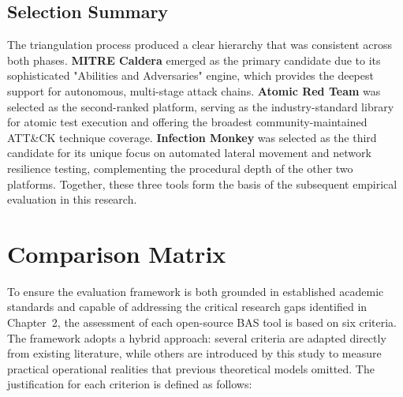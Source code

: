 \subsection{Selection Summary}
The triangulation process produced a clear hierarchy that was consistent across both phases. \textbf{MITRE Caldera} emerged as the primary candidate due to its sophisticated "Abilities and Adversaries" engine, which provides the deepest support for autonomous, multi-stage attack chains. \textbf{Atomic Red Team} was selected as the second-ranked platform, serving as the industry-standard library for atomic test execution and offering the broadest community-maintained ATT\&CK technique coverage. \textbf{Infection Monkey} was selected as the third candidate for its unique focus on automated lateral movement and network resilience testing, complementing the procedural depth of the other two platforms. Together, these three tools form the basis of the subsequent empirical evaluation in this research.

\section{Comparison Matrix}
To ensure the evaluation framework is both grounded in established academic standards and capable of addressing the critical research gaps identified in Chapter~2, the assessment of each open-source BAS tool is based on six criteria. The framework adopts a hybrid approach: several criteria are adapted directly from existing literature, while others are introduced by this study to measure practical operational realities that previous theoretical models omitted. The justification for each criterion is defined as follows:

